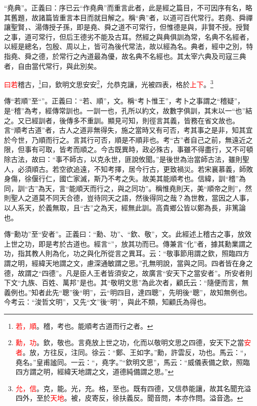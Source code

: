 {\noindent\shu{}\fzkt “堯典”。正義曰：序已云“作堯典”而重言此者，此是經之篇目，不可因序有名，略其舊題，故諸篇皆重言本目而就目解之。稱“典”者，以道可百代常行。若堯、舜禪讓聖賢，、湯傳授子孫，即是堯、舜之道不可常行，但惟德是與，非賢不授。授賢之事，道可常行，但后王德劣不能及古耳。然經之與典俱訓為常，名典不名經者，以經是總名，包殷、周以上，皆可為後代常法，故以經為名。典者，經中之別，特指堯、舜之德，於常行之內道最為優，故名典不名經也。其太宰六典及司寇三典者，自由當代常行，與此別矣。 \par}

\textcolor{red}{曰若}稽古，\footnote{\textcolor{red}{若，順}。稽，考也。能順考古道而行之者\textcolor{red}{}。}曰，欽明文思安安\footnote{\textcolor{red}{勳，功}。欽，敬也。言堯放上世之功，化而以敬明文思之四德，安天下之當\textcolor{red}{安者}。放，方往反，注同。徐云：“鄭、王如字。”勳，許雲反，功也。馬云：“，堯名。”皇甫謐同。一云：“，堯字。”“欽明文思”，馬云：“威儀表備之欽，照臨四方謂之明，經緯天地謂之文，道德純備謂之思。”}，允恭克讓，光被四表，格於\textcolor{red}{上下}。\footnote{\textcolor{red}{允，信}。克，能。光，充。格，至也。既有四德，又信恭能讓，故其名聞充溢四外，至於\textcolor{red}{天地}。被，皮寄反，徐扶義反。聞音問，本亦作問。溢音逸。}

{\noindent\zhuan{}\fzbyks 傳“若順”至“”。正義曰：“若、順”，文。稱“考卜惟王”，考卜之事謂之“稽疑”，是“稽”為考，經傳常訓也。一訓一也，孔所以約文，故數字俱訓，其末以一“也”結之。又已經訓者，後傳多不重訓。顯見可知，則徑言其義，皆務在省文故也。言“順考古道”者，古人之道非無得失，施之當時又有可否，考其事之是非，知其宜於今世，乃順而行之。言其行可否，順是不順非也。考“古”者自己之前，無遠近之限，但事有可取，皆考而順之。今古既異時，政必殊古，事雖不得盡行，又不可頓除古法，故曰：“事不師古，以克永世，匪說攸聞。”是後世為治當師古法，雖則聖人，必須順古。若空欲追遠，不知考擇，居今行古，更致禍災。若宋襄慕義，師敗身傷，徐偃行仁，國亡家滅，斯乃不考之失。故美其能順考也。信緯，訓“稽”為同，訓“古”為天，言“能順天而行之，與之同功”。稱惟堯則天，美“順帝之則”，然則聖人之道莫不同天合德，豈待同天之語，然後得同之哉？為世教，當因之人事，以人系天，於義無取，且“古”之為天，經無此訓。高貴鄉公皆以鄭為長，非篤論也。 \par}

{\noindent\zhuan{}\fzbyks 傳“勳功”至“安者”。正義曰：“勳、功”、“欽、敬”，文。此經述上稽古之事，放效上世之功，即是考於古道也。經言“”，放其功而已。傳兼言“化”者，據其勳業謂之功，指其教人則為化，功之與化所從言之異耳。云：“敬事節用謂之欽，照臨四方謂之明，經緯天地謂之文，慮深通敏謂之思。”孔無明說，當與之同。四者皆在身之德，故謂之“四德”。凡是臣人王者皆須安之，故廣言“安天下之當安者”。所安者則下文“九族、百姓、萬邦”是也。其“敬明文思”為此次者，顧氏云：“隨便而言，無義例也。”知者此先“聰”後“明”，云“明四目，達四聰”，先明後“聰”，故知無例也。今考云：“浚哲文明”，又先“文”後“明”，與此不類，知顧氏為得也。 \par}

